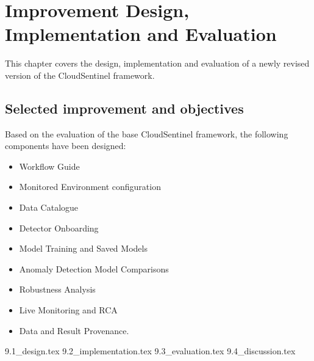 \chapter{Improvement Design, Implementation and Evaluation}%
\label{ch:improvement_design_implementation_and_evaluation}


This chapter covers the design, implementation and evaluation of a newly revised version of the CloudSentinel framework.

\section{Selected improvement and objectives}

Based on the evaluation of the base CloudSentinel framework, the following components have been designed:

\begin{itemize}
    \item Workflow Guide
    \item Monitored Environment configuration
    \item Data Catalogue
    \item Detector Onboarding
    \item Model Training and Saved Models
    \item Anomaly Detection Model Comparisons
    \item Robustness Analysis
    \item Live Monitoring and RCA
    \item Data and Result Provenance.
\end{itemize}

{9.1_design.tex}
{9.2_implementation.tex}
{9.3_evaluation.tex}
{9.4_discussion.tex}
